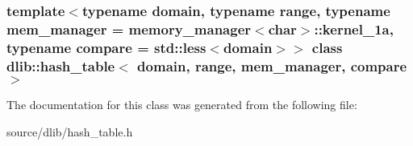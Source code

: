 \subsubsection*{template$<$typename domain, typename range, typename mem\_\-manager = memory\_\-manager$<$char$>$::kernel\_\-1a, typename compare = std::less$<$domain$>$$>$ class dlib::hash\_\-table$<$ domain, range, mem\_\-manager, compare $>$}



The documentation for this class was generated from the following file:\begin{DoxyCompactItemize}
\item 
source/dlib/hash\_\-table.h\end{DoxyCompactItemize}
